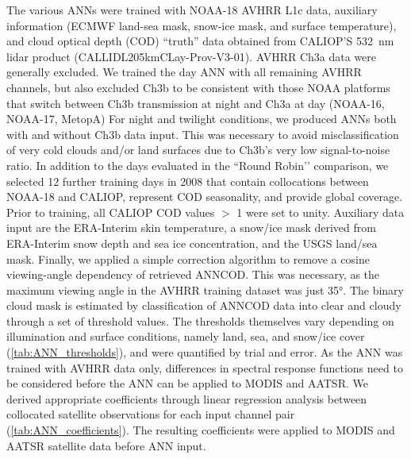The various ANNs were trained with NOAA-18 AVHRR L1c data, auxiliary information (ECMWF land-sea mask, snow-ice mask, and surface temperature), and cloud optical depth (COD) ``truth'' data obtained from CALIOP'S 532~nm lidar product (\mbox{CAL\textunderscore LID\textunderscore L2\textunderscore 05kmCLay-Prov-V3-01}). AVHRR Ch3a data were generally excluded. We trained the day ANN with all remaining AVHRR channels, but also excluded Ch3b to be consistent with those NOAA platforms that switch between Ch3b transmission at night and Ch3a at day (NOAA-16, NOAA-17, MetopA) For night and twilight conditions, we produced ANNs both with and without Ch3b data input. This was necessary to avoid misclassification of very cold clouds and/or land surfaces due to Ch3b's very low signal-to-noise ratio. In addition to the days evaluated in the ``Round Robin’’ comparison, we selected 12 further training days in 2008 that contain collocations between NOAA-18 and CALIOP, represent COD seasonality, and provide global coverage. Prior to training, all CALIOP COD values $>$ 1 were set to unity. Auxiliary data input are the ERA-Interim skin temperature, a snow/ice mask derived from ERA-Interim snow depth and sea ice concentration, and the USGS land/sea mask. Finally, we applied a simple correction algorithm to remove a cosine viewing-angle dependency of retrieved ANNCOD. This was necessary, as the maximum viewing angle in the AVHRR training dataset was just 35°.
The binary cloud mask is estimated by classification of ANNCOD data into clear and cloudy through a set of threshold values. The thresholds themselves vary depending on illumination and surface conditions, namely land, sea, and snow/ice cover (\autoref{tab:ANN_thresholds}), and were quantified by trial and error. As the ANN was trained with AVHRR data only, differences in spectral response functions need to be considered before the ANN can be applied to MODIS and AATSR. We derived appropriate coefficients through linear regression analysis between collocated satellite observations for each input channel pair (\autoref{tab:ANN_coefficients}). The resulting coefficients were applied to MODIS and AATSR satellite data before ANN input.

